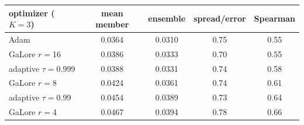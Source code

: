 \begin{tabular}{lcccc}
\toprule
optimizer ($K{=}3$) & mean member & ensemble & spread/error & Spearman \\
\midrule
Adam & 0.0364 & 0.0310 & 0.75 & 0.55 \\
GaLore $r{=}$16 & 0.0386 & 0.0333 & 0.70 & 0.55 \\
adaptive $\tau{=}$0.999 & 0.0388 & 0.0331 & 0.74 & 0.58 \\
GaLore $r{=}$8 & 0.0424 & 0.0361 & 0.74 & 0.61 \\
adaptive $\tau{=}$0.99 & 0.0454 & 0.0389 & 0.73 & 0.64 \\
GaLore $r{=}$4 & 0.0467 & 0.0394 & 0.78 & 0.66 \\
\bottomrule
\end{tabular}